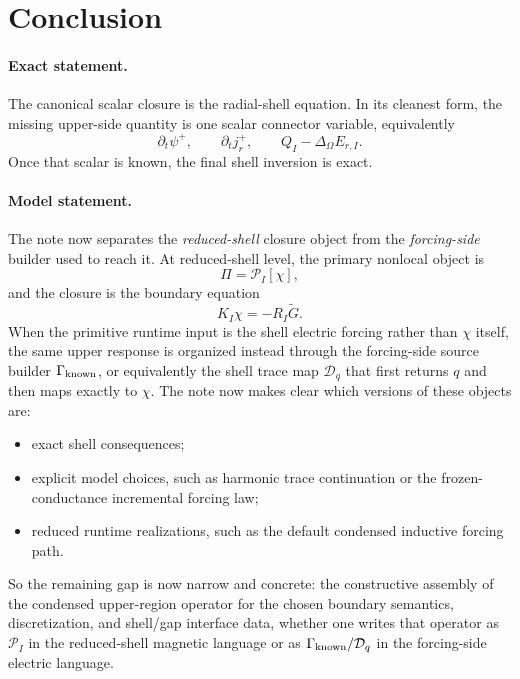 \documentclass[11pt,a4paper]{article}
\begin{document}
\section*{Conclusion}

\paragraph{Exact statement.}
The canonical scalar closure is the radial-shell equation. In its cleanest
form, the missing upper-side quantity is one scalar connector variable,
equivalently
\[
\partial_t\psi^+,
\qquad
\partial_t j_r^+,
\qquad
Q_I-\Delta_\Omega E_{r,I}.
\]
Once that scalar is known, the final shell inversion is exact.

\paragraph{Model statement.}
The note now separates the \emph{reduced-shell} closure object from the
\emph{forcing-side} builder used to reach it. At reduced-shell level, the
primary nonlocal object is
\[
\Pi = \mathcal P_I[\chi],
\]
and the closure is the boundary equation
\[
K_I \chi = -R_I \widetilde G.
\]
When the primitive runtime input is the shell electric forcing rather than
\(\chi\) itself, the same upper response is organized instead through the
forcing-side source builder \(\Gamma_{\rm known}\), or equivalently the shell
trace map \(\mathcal D_q\) that first returns \(q\) and then maps exactly to
\(\chi\). The note now makes clear which versions of these objects are:
\begin{itemize}
\item exact shell consequences;
\item explicit model choices, such as harmonic trace continuation or the
frozen-conductance incremental forcing law;
\item reduced runtime realizations, such as the default condensed inductive
forcing path.
\end{itemize}
So the remaining gap is now narrow and concrete: the constructive assembly of
the condensed upper-region operator for the chosen boundary semantics,
discretization, and shell/gap interface data, whether one writes that
operator as \(\mathcal P_I\) in the reduced-shell magnetic language or as
\(\Gamma_{\rm known}/\mathcal D_q\) in the forcing-side electric language.
\end{document}
